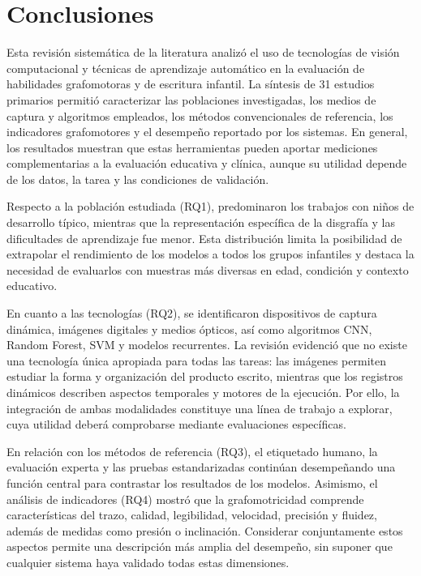 \documentclass{iaesarticle}
\begin{document}
\FloatBarrier


\section{Conclusiones}
\label{sec:conclusiones}

Esta revisión sistemática de la literatura analizó el uso de tecnologías de
visión computacional y técnicas de aprendizaje automático en la evaluación de
habilidades grafomotoras y de escritura infantil. La síntesis de 31 estudios
primarios permitió caracterizar las poblaciones investigadas, los medios de
captura y algoritmos empleados, los métodos convencionales de referencia, los
indicadores grafomotores y el desempeño reportado por los sistemas. En general,
los resultados muestran que estas herramientas pueden aportar mediciones
complementarias a la evaluación educativa y clínica, aunque su utilidad depende
de los datos, la tarea y las condiciones de validación.

Respecto a la población estudiada (RQ1), predominaron los trabajos con niños
de desarrollo típico, mientras que la representación específica de la disgrafía
y las dificultades de aprendizaje fue menor. Esta distribución limita la
posibilidad de extrapolar el rendimiento de los modelos a todos los grupos
infantiles y destaca la necesidad de evaluarlos con muestras más diversas en
edad, condición y contexto educativo.

En cuanto a las tecnologías (RQ2), se identificaron dispositivos de captura
dinámica, imágenes digitales y medios ópticos, así como algoritmos CNN, Random
Forest, SVM y modelos recurrentes. La revisión evidenció que no existe una
tecnología única apropiada para todas las tareas: las imágenes permiten
estudiar la forma y organización del producto escrito, mientras que los
registros dinámicos describen aspectos temporales y motores de la ejecución.
Por ello, la integración de ambas modalidades constituye una línea de trabajo
a explorar, cuya utilidad deberá comprobarse mediante evaluaciones específicas.

En relación con los métodos de referencia (RQ3), el etiquetado humano, la
evaluación experta y las pruebas estandarizadas continúan desempeñando una
función central para contrastar los resultados de los modelos. Asimismo, el
análisis de indicadores (RQ4) mostró que la grafomotricidad comprende
características del trazo, calidad, legibilidad, velocidad, precisión y fluidez,
además de medidas como presión o inclinación. Considerar conjuntamente estos
aspectos permite una descripción más amplia del desempeño, sin suponer que
cualquier sistema haya validado todas estas dimensiones.
\end{document}
